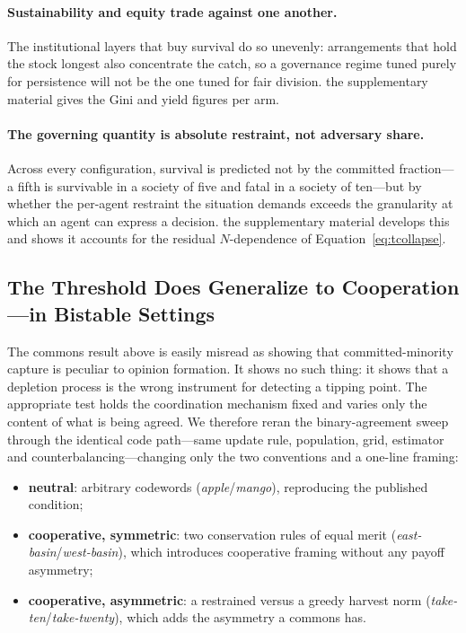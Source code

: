 \documentclass[manuscript,screen,review]{acmart}
\begin{document}
\paragraph{Sustainability and equity trade against one another.} The
institutional layers that buy survival do so unevenly: arrangements that hold the
stock longest also concentrate the catch, so a governance regime tuned purely for
persistence will not be the one tuned for fair division. the supplementary material
gives the Gini and yield figures per arm.

\paragraph{The governing quantity is absolute restraint, not adversary share.}
Across every configuration, survival is predicted not by the committed fraction---a
fifth is survivable in a society of five and fatal in a society of ten---but by
whether the per-agent restraint the situation demands exceeds the granularity at
which an agent can express a decision. the supplementary material develops this and
shows it accounts for the residual $N$-dependence of Equation~\ref{eq:tcollapse}.

\subsection{The Threshold Does Generalize to Cooperation---in Bistable Settings}
\label{sec:content}
The commons result above is easily misread as showing that committed-minority
capture is peculiar to opinion formation. It shows no such thing: it shows that a
depletion process is the wrong instrument for detecting a tipping point. The
appropriate test holds the coordination mechanism fixed and varies only the
content of what is being agreed. We therefore reran the binary-agreement sweep
through the identical code path---same update rule, population, grid, estimator
and counterbalancing---changing only the two conventions and a one-line framing:

\begin{itemize}[leftmargin=1.2em,itemsep=1pt,topsep=2pt]
\item \textbf{neutral}: arbitrary codewords (\emph{apple}/\emph{mango}), reproducing
      the published condition;
\item \textbf{cooperative, symmetric}: two conservation rules of equal merit
      (\emph{east-basin}/\emph{west-basin}), which introduces cooperative framing
      without any payoff asymmetry;
\item \textbf{cooperative, asymmetric}: a restrained versus a greedy harvest norm
      (\emph{take-ten}/\emph{take-twenty}), which adds the asymmetry a commons has.
\end{itemize}
\end{document}
